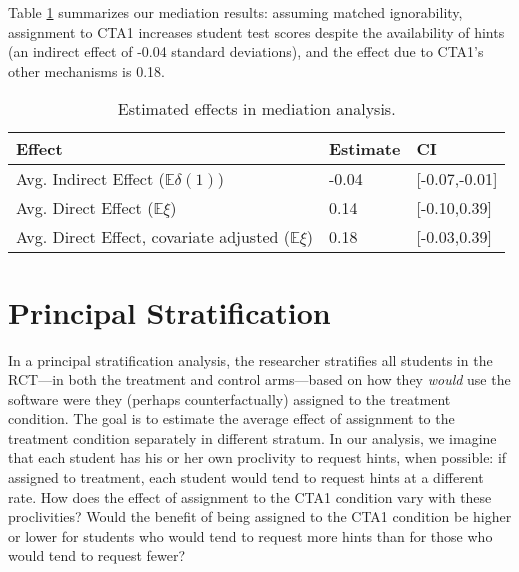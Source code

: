 \documentclass{article}\usepackage[]{graphicx}\usepackage[]{color}
\newcommand{\EE}{\mathbb{E}}
\begin{document}
Table \ref{tab:mediation} summarizes our mediation results: assuming matched ignorability, assignment to CTA1 increases student test scores despite the availability of hints (an indirect effect of -0.04 standard deviations), and the effect due to CTA1's other mechanisms is 0.18.

\begin{table}
\centering
\begin{tabular}{lll}
\hline
Effect&Estimate&CI\\
\hline
Avg. Indirect Effect ($\EE \delta(1)$)& -0.04 & [-0.07,-0.01] \\
Avg. Direct Effect ($\EE\xi$)& 0.14 & [-0.10,0.39] \\
Avg. Direct Effect, covariate adjusted ($\EE\xi$) & 0.18 & [-0.03,0.39] \\

\hline
\end{tabular}
\caption{Estimated effects in mediation analysis. }
\label{tab:mediation}
\end{table}

\section{Principal Stratification}\label{sec:principalStratification}

In a principal stratification \citep[PS;][]{frangakis}  analysis, the researcher stratifies all students in
the RCT---in both the treatment and control arms---based on how they
\emph{would} use the software were they (perhaps counterfactually) assigned
to the treatment condition.
The goal is to estimate the average effect of
assignment to the treatment condition separately in different stratum.
In our analysis, we imagine that each student has his or her own proclivity to request hints, when possible: if assigned to treatment, each student would tend to request hints at a different rate.
How does the effect of assignment to the CTA1 condition vary with these proclivities?
Would the benefit of being assigned to the CTA1 condition be higher or lower for students who would tend to request more hints than for those who would tend to request fewer?
\end{document}

